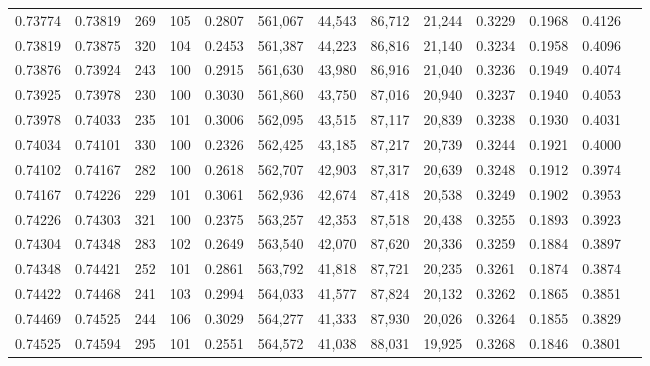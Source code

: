 \begin{tabular}{rrrrrrrrrrrrr}
0.73774 & 0.73819 &   269 & 105 &                                     0.2807 & 561,067 &  44,543 &  86,712 &  21,244 & 0.3229 & 0.1968 & 0.4126 \\
0.73819 & 0.73875 &   320 & 104 &                                     0.2453 & 561,387 &  44,223 &  86,816 &  21,140 & 0.3234 & 0.1958 & 0.4096 \\
0.73876 & 0.73924 &   243 & 100 &                                     0.2915 & 561,630 &  43,980 &  86,916 &  21,040 & 0.3236 & 0.1949 & 0.4074 \\
0.73925 & 0.73978 &   230 & 100 &                                     0.3030 & 561,860 &  43,750 &  87,016 &  20,940 & 0.3237 & 0.1940 & 0.4053 \\
0.73978 & 0.74033 &   235 & 101 &                                     0.3006 & 562,095 &  43,515 &  87,117 &  20,839 & 0.3238 & 0.1930 & 0.4031 \\
0.74034 & 0.74101 &   330 & 100 &                                     0.2326 & 562,425 &  43,185 &  87,217 &  20,739 & 0.3244 & 0.1921 & 0.4000 \\
0.74102 & 0.74167 &   282 & 100 &                                     0.2618 & 562,707 &  42,903 &  87,317 &  20,639 & 0.3248 & 0.1912 & 0.3974 \\
0.74167 & 0.74226 &   229 & 101 &                                     0.3061 & 562,936 &  42,674 &  87,418 &  20,538 & 0.3249 & 0.1902 & 0.3953 \\
0.74226 & 0.74303 &   321 & 100 &                                     0.2375 & 563,257 &  42,353 &  87,518 &  20,438 & 0.3255 & 0.1893 & 0.3923 \\
0.74304 & 0.74348 &   283 & 102 &                                     0.2649 & 563,540 &  42,070 &  87,620 &  20,336 & 0.3259 & 0.1884 & 0.3897 \\
0.74348 & 0.74421 &   252 & 101 &                                     0.2861 & 563,792 &  41,818 &  87,721 &  20,235 & 0.3261 & 0.1874 & 0.3874 \\
0.74422 & 0.74468 &   241 & 103 &                                     0.2994 & 564,033 &  41,577 &  87,824 &  20,132 & 0.3262 & 0.1865 & 0.3851 \\
0.74469 & 0.74525 &   244 & 106 &                                     0.3029 & 564,277 &  41,333 &  87,930 &  20,026 & 0.3264 & 0.1855 & 0.3829 \\
0.74525 & 0.74594 &   295 & 101 &                                     0.2551 & 564,572 &  41,038 &  88,031 &  19,925 & 0.3268 & 0.1846 & 0.3801 \\

\end{tabular}
